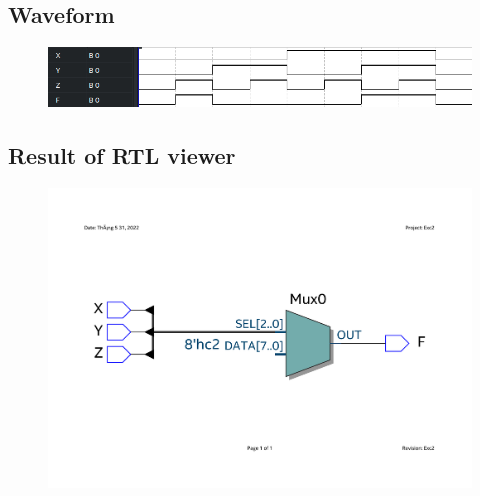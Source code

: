 \documentclass[13pt,a4paper]{report}
\begin{document}
\subsection{Waveform}
\begin{figure}[H]
\centering
\includegraphics[scale=0.8]{images/Exc2_waveform.png}
\end{figure}

\subsection{Result of RTL viewer}
\begin{figure}[H]
\centering
\includegraphics[scale=0.5, clip, trim={2cm 4cm 2cm 7cm}]{images/Exc2_RTL.pdf}
\end{figure}
\end{document}
